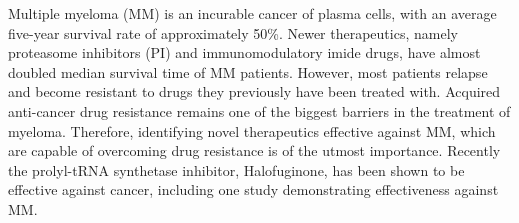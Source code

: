 
Multiple myeloma (MM) is an incurable cancer of plasma cells, with an average five-year survival rate of approximately 50\%.
Newer therapeutics, namely proteasome inhibitors (PI) and immunomodulatory imide drugs, have almost doubled median survival time of MM patients.
However, most patients relapse and become resistant to drugs they previously have been treated with.
Acquired anti-cancer drug resistance remains one of the biggest barriers in the treatment of myeloma.
Therefore, identifying novel therapeutics effective against MM, which are capable of overcoming drug resistance is of the utmost importance.
Recently the prolyl-tRNA synthetase inhibitor, Halofuginone, has been shown to be effective against cancer, including one study demonstrating effectiveness against MM\@.






